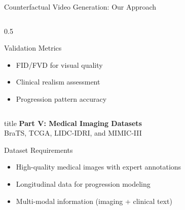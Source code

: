\documentclass[aspectratio=169]{beamer}
\begin{document}
\begin{frame}{Counterfactual Video Generation: Our Approach}
\begin{columns}
\begin{column}{0.5\textwidth}
            \begin{alertblock}{Validation Metrics}
                \begin{itemize}
                    \item FID/FVD for visual quality
                    \item Clinical realism assessment
                    \item Progression pattern accuracy
                \end{itemize}
            \end{alertblock}
        \end{column}
    \end{columns}
\end{frame}

\begin{frame}[plain]
    \centering
    \vfill
    \begin{beamercolorbox}[center,shadow=true,rounded=true]{title}
        \textbf{Part V: Medical Imaging Datasets}\\
        \vspace{0.5em}
        \large BraTS, TCGA, LIDC-IDRI, and MIMIC-III
    \end{beamercolorbox}
    \vfill
    
    \vspace{1em}
    \normalsize
    \begin{block}{Dataset Requirements}
        \begin{itemize}
            \item High-quality medical images with expert annotations
            \item Longitudinal data for progression modeling
            \item Multi-modal information (imaging + clinical text)
        \end{itemize}
    \end{block}
\end{frame}
\end{document}
